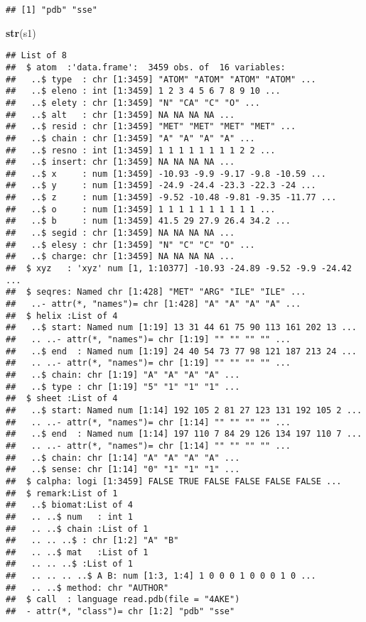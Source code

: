 \documentclass[
]{article}
\newenvironment{Shaded}{\begin{snugshade}}{\end{snugshade}}
\newcommand{\KeywordTok}[1]{\textcolor[rgb]{0.13,0.29,0.53}{\textbf{#1}}}
\newcommand{\NormalTok}[1]{#1}
\begin{document}
\begin{verbatim}
## [1] "pdb" "sse"
\end{verbatim}

\begin{Shaded}
\begin{Highlighting}[]
\KeywordTok{str}\NormalTok{(s1)}
\end{Highlighting}
\end{Shaded}

\begin{verbatim}
## List of 8
##  $ atom  :'data.frame':  3459 obs. of  16 variables:
##   ..$ type  : chr [1:3459] "ATOM" "ATOM" "ATOM" "ATOM" ...
##   ..$ eleno : int [1:3459] 1 2 3 4 5 6 7 8 9 10 ...
##   ..$ elety : chr [1:3459] "N" "CA" "C" "O" ...
##   ..$ alt   : chr [1:3459] NA NA NA NA ...
##   ..$ resid : chr [1:3459] "MET" "MET" "MET" "MET" ...
##   ..$ chain : chr [1:3459] "A" "A" "A" "A" ...
##   ..$ resno : int [1:3459] 1 1 1 1 1 1 1 1 2 2 ...
##   ..$ insert: chr [1:3459] NA NA NA NA ...
##   ..$ x     : num [1:3459] -10.93 -9.9 -9.17 -9.8 -10.59 ...
##   ..$ y     : num [1:3459] -24.9 -24.4 -23.3 -22.3 -24 ...
##   ..$ z     : num [1:3459] -9.52 -10.48 -9.81 -9.35 -11.77 ...
##   ..$ o     : num [1:3459] 1 1 1 1 1 1 1 1 1 1 ...
##   ..$ b     : num [1:3459] 41.5 29 27.9 26.4 34.2 ...
##   ..$ segid : chr [1:3459] NA NA NA NA ...
##   ..$ elesy : chr [1:3459] "N" "C" "C" "O" ...
##   ..$ charge: chr [1:3459] NA NA NA NA ...
##  $ xyz   : 'xyz' num [1, 1:10377] -10.93 -24.89 -9.52 -9.9 -24.42 ...
##  $ seqres: Named chr [1:428] "MET" "ARG" "ILE" "ILE" ...
##   ..- attr(*, "names")= chr [1:428] "A" "A" "A" "A" ...
##  $ helix :List of 4
##   ..$ start: Named num [1:19] 13 31 44 61 75 90 113 161 202 13 ...
##   .. ..- attr(*, "names")= chr [1:19] "" "" "" "" ...
##   ..$ end  : Named num [1:19] 24 40 54 73 77 98 121 187 213 24 ...
##   .. ..- attr(*, "names")= chr [1:19] "" "" "" "" ...
##   ..$ chain: chr [1:19] "A" "A" "A" "A" ...
##   ..$ type : chr [1:19] "5" "1" "1" "1" ...
##  $ sheet :List of 4
##   ..$ start: Named num [1:14] 192 105 2 81 27 123 131 192 105 2 ...
##   .. ..- attr(*, "names")= chr [1:14] "" "" "" "" ...
##   ..$ end  : Named num [1:14] 197 110 7 84 29 126 134 197 110 7 ...
##   .. ..- attr(*, "names")= chr [1:14] "" "" "" "" ...
##   ..$ chain: chr [1:14] "A" "A" "A" "A" ...
##   ..$ sense: chr [1:14] "0" "1" "1" "1" ...
##  $ calpha: logi [1:3459] FALSE TRUE FALSE FALSE FALSE FALSE ...
##  $ remark:List of 1
##   ..$ biomat:List of 4
##   .. ..$ num   : int 1
##   .. ..$ chain :List of 1
##   .. .. ..$ : chr [1:2] "A" "B"
##   .. ..$ mat   :List of 1
##   .. .. ..$ :List of 1
##   .. .. .. ..$ A B: num [1:3, 1:4] 1 0 0 0 1 0 0 0 1 0 ...
##   .. ..$ method: chr "AUTHOR"
##  $ call  : language read.pdb(file = "4AKE")
##  - attr(*, "class")= chr [1:2] "pdb" "sse"
\end{verbatim}
\end{document}
